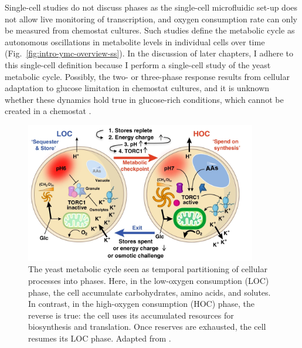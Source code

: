 Single-cell studies \parencite{papagiannakisAutonomousMetabolicOscillations2017, baumgartnerFlavinbasedMetabolicCycles2018} do not discuss phases as the single-cell microfluidic set-up does not allow live monitoring of transcription, and oxygen consumption rate can only be measured from chemostat cultures.
Such studies define the metabolic cycle as autonomous oscillations in metabolite levels in individual cells over time (Fig.\ \ref{fig:intro-ymc-overview-ss}).
In the discussion of later chapters, I adhere to this single-cell definition because I perform a single-cell study of the yeast metabolic cycle.
Possibly, the two- or three-phase response results from cellular adaptation to glucose limitation in chemostat cultures, and it is unknown whether these dynamics hold true in glucose-rich conditions, which cannot be created in a chemostat \parencite{slavovCouplingGrowthRate2011}.

\begin{figure}
  \centering
  \includegraphics[width=0.9\textwidth]{oneillEukaryoticCellBiology2020_3a_adapted}
  \caption[
    The yeast metabolic cycle seen as temporal partitioning of cellular processes into phases
  ]{
    The yeast metabolic cycle seen as temporal partitioning of cellular processes into phases.
    Here, in the low-oxygen consumption (LOC) phase, the cell accumulate carbohydrates, amino acids, and solutes.
    In contrast, in the high-oxygen consumption (HOC) phase, the reverse is true:
    the cell uses its accumulated resources for biosynthesis and translation.
    Once reserves are exhausted, the cell resumes its LOC phase.
    Adapted from \textcite{oneillEukaryoticCellBiology2020}.}
  \label{fig:intro-ymc-overview-oneill}
\end{figure}

